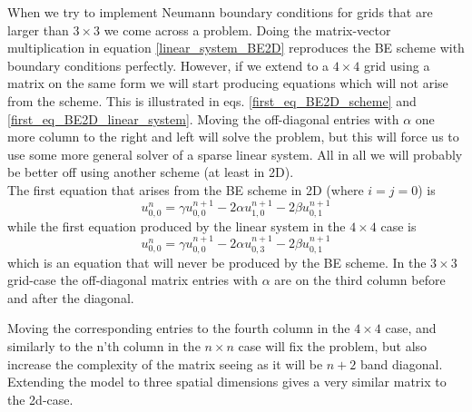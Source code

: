 When we try to implement Neumann boundary conditions for grids that are larger than $3\times3$ we come across a problem. 
Doing the matrix-vector multiplication in equation \ref{linear_system_BE2D} reproduces the BE scheme with boundary conditions perfectly. 
However, if we extend to a $4\times4$ grid using a matrix on the same form we will start producing equations which will not arise from the scheme. 
This is illustrated in eqs. \ref{first_eq_BE2D_scheme} and \ref{first_eq_BE2D_linear_system}. 
Moving the off-diagonal entries with $\alpha$ one more column to the right and left will solve the problem, but this will force us to use some more general solver of a sparse linear system. 
All in all we will probably be better off using another scheme (at least in 2D).\\
The first equation that arises from the BE scheme in 2D (where $i=j=0$) is
\begin{equation}\label{first_eq_BE2D_scheme}
 u^n_{0,0} = \gamma u^{n+1}_{0,0}-2\alpha u^{n+1}_{1,0} -2\beta u^{n+1}_{0,1}
\end{equation}
while the first equation produced by the linear system in the $4\times4$ case is 
\begin{equation}\label{first_eq_BE2D_linear_system}
 u^n_{0,0} = \gamma u^{n+1}_{0,0}-2\alpha u^{n+1}_{0,3} -2\beta u^{n+1}_{0,1}
\end{equation}
which is an equation that will never be produced by the BE scheme. 
In the $3\times3$ grid-case the off-diagonal matrix entries with $\alpha$ are on the third column before and after the diagonal. 

Moving the corresponding entries to the fourth column in the $4\times4$ case, and similarly to the n'th column in the $n\times n$ case will fix the problem, but also increase the complexity of the matrix seeing as it will be $n+2$ band diagonal.\\
Extending the model to three spatial dimensions gives a very similar matrix to the 2d-case. 

